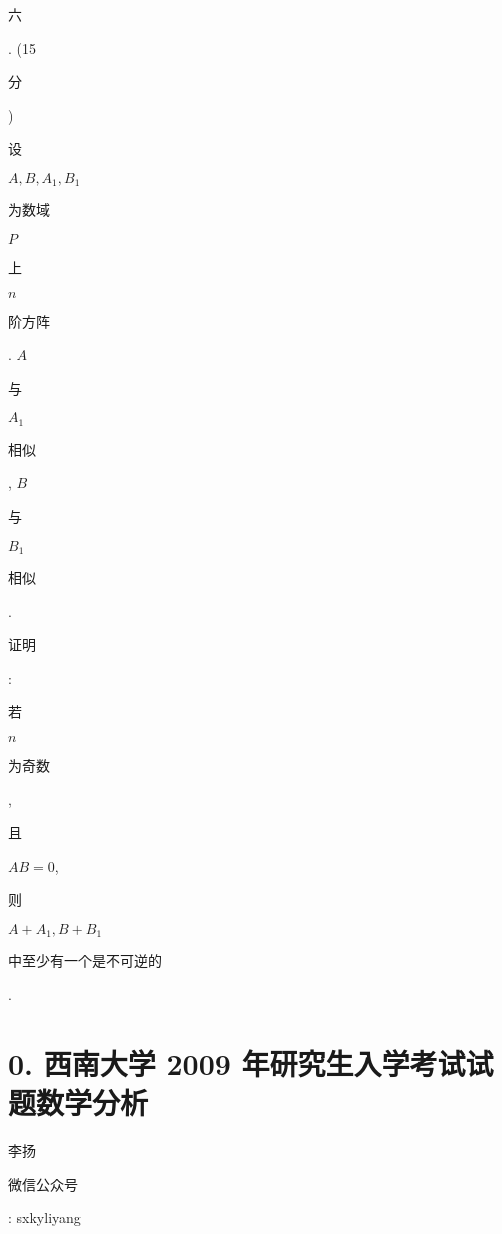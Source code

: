 \documentclass[10pt]{article}
\begin{document}
\begin{CJK}{UTF8}{mj}六\end{CJK}. (15 \begin{CJK}{UTF8}{mj}分\end{CJK}) \begin{CJK}{UTF8}{mj}设\end{CJK} $A, B, A_{1}, B_{1}$ \begin{CJK}{UTF8}{mj}为数域\end{CJK} $P$ \begin{CJK}{UTF8}{mj}上\end{CJK} $n$ \begin{CJK}{UTF8}{mj}阶方阵\end{CJK}. $A$ \begin{CJK}{UTF8}{mj}与\end{CJK} $A_{1}$ \begin{CJK}{UTF8}{mj}相似\end{CJK}, $B$ \begin{CJK}{UTF8}{mj}与\end{CJK} $B_{1}$ \begin{CJK}{UTF8}{mj}相似\end{CJK}. \begin{CJK}{UTF8}{mj}证明\end{CJK}: \begin{CJK}{UTF8}{mj}若\end{CJK} $n$ \begin{CJK}{UTF8}{mj}为奇数\end{CJK}, \begin{CJK}{UTF8}{mj}且\end{CJK} $A B=0$, \begin{CJK}{UTF8}{mj}则\end{CJK} $A+A_{1}, B+B_{1}$ \begin{CJK}{UTF8}{mj}中至少有一个是不可逆的\end{CJK}.

\section{0. 西南大学 2009 年研究生入学考试试题数学分析}
\begin{CJK}{UTF8}{mj}李扬\end{CJK}

\begin{CJK}{UTF8}{mj}微信公众号\end{CJK}: sxkyliyang
\end{document}
